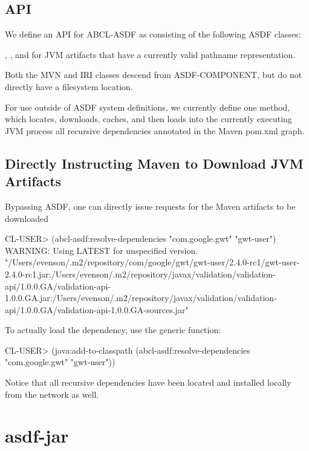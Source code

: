 \documentclass[10pt]{book}
\begin{document}
\subsection{API}

We define an API for \textsc{ABCL-ASDF} as consisting of the following
ASDF classes:

, , and
 for JVM artifacts that have a currently
valid pathname representation.

Both the MVN and IRI classes descend from ASDF-COMPONENT, but do not
directly have a filesystem location.

For use outside of ASDF system definitions, we currently define one
method,  which locates,
downloads, caches, and then loads into the currently executing JVM
process all recursive dependencies annotated in the Maven pom.xml
graph.

\subsection{Directly Instructing Maven to Download JVM Artifacts}

Bypassing \textsc{ASDF}, one can directly issue requests for the Maven
artifacts to be downloaded

\begin{listing-lisp}
CL-USER> (abcl-asdf:resolve-dependencies "com.google.gwt" "gwt-user")
WARNING: Using LATEST for unspecified version.
"/Users/evenson/.m2/repository/com/google/gwt/gwt-user/2.4.0-rc1/gwt-user-2.4.0-rc1.jar:/Users/evenson/.m2/repository/javax/validation/validation-api/1.0.0.GA/validation-api-1.0.0.GA.jar:/Users/evenson/.m2/repository/javax/validation/validation-api/1.0.0.GA/validation-api-1.0.0.GA-sources.jar"
\end{listing-lisp}

To actually load the dependency, use the  generic
function:

\begin{listing-lisp}
CL-USER> (java:add-to-classpath (abcl-asdf:resolve-dependencies "com.google.gwt" "gwt-user"))
\end{listing-lisp}

Notice that all recursive dependencies have been located and installed
locally from the network as well.

\section{asdf-jar}
\end{document}
